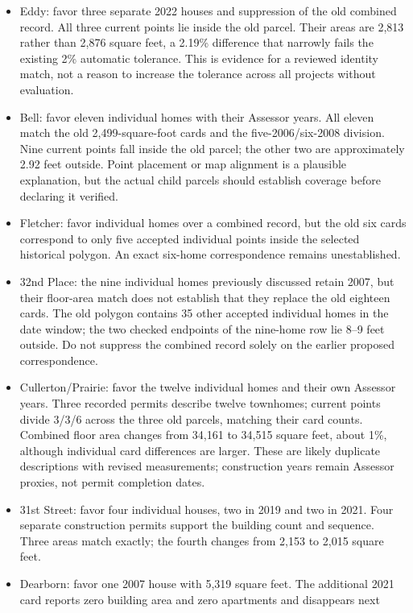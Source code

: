 \begin{itemize}
\item Eddy: favor three separate 2022 houses and suppression of the old combined
record. All three current points lie inside the old parcel. Their areas are
2,813 rather than 2,876 square feet, a 2.19\% difference that narrowly fails the
existing 2\% automatic tolerance. This is evidence for a reviewed identity match,
not a reason to increase the tolerance across all projects without evaluation.
\item Bell: favor eleven individual homes with their Assessor years. All eleven
match the old 2,499-square-foot cards and the five-2006/six-2008 division.
Nine current points fall inside the old parcel; the other two are approximately
2.92 feet outside. Point placement or map alignment is a plausible explanation,
but the actual child parcels should establish coverage before declaring it verified.
\item Fletcher: favor individual homes over a combined record, but the old six
cards correspond to only five accepted individual points inside the selected
historical polygon. An exact six-home correspondence remains unestablished.
\item 32nd Place: the nine individual homes previously discussed retain 2007,
but their floor-area match does not establish that they replace the old eighteen
cards. The old polygon contains 35 other accepted individual homes in the date
window; the two checked endpoints of the nine-home row lie 8--9 feet outside.
Do not suppress the combined record solely on the earlier proposed correspondence.
\item Cullerton/Prairie: favor the twelve individual homes and their own Assessor
years. Three recorded permits describe twelve townhomes; current points divide
3/3/6 across the three old parcels, matching their card counts. Combined floor
area changes from 34,161 to 34,515 square feet, about 1\%, although individual
card differences are larger. These are likely duplicate descriptions with revised
measurements; construction years remain Assessor proxies, not permit completion dates.
\item 31st Street: favor four individual houses, two in 2019 and two in 2021.
Four separate construction permits support the building count and sequence.
Three areas match exactly; the fourth changes from 2,153 to 2,015 square feet.
\item Dearborn: favor one 2007 house with 5,319 square feet. The additional
2021 card reports zero building area and zero apartments and disappears next

\end{itemize}
